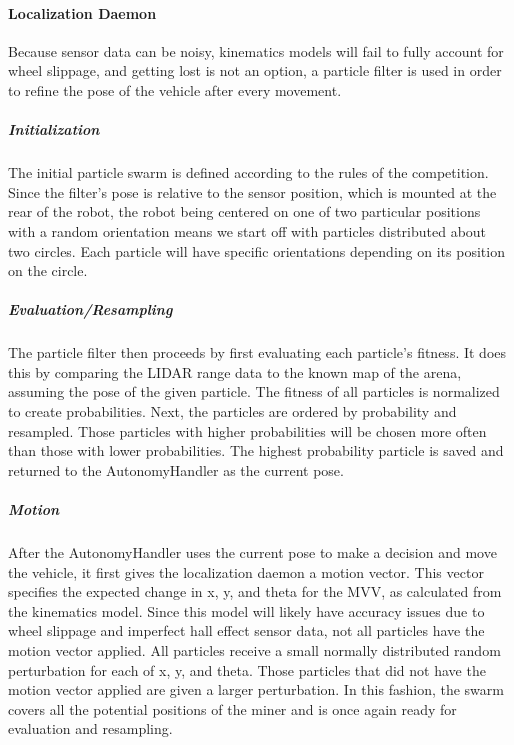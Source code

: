 \paragraph{Localization Daemon}
Because sensor data can be noisy, kinematics models will fail to fully account for wheel slippage, and getting lost is not an option, a particle filter is used in order to refine the pose of the vehicle after every movement.
\subparagraph{Initialization}
The initial particle swarm is defined according to the rules of the competition.  Since the filter's pose is relative to the sensor position, which is mounted at the rear of the robot, the robot being centered on one of two particular positions with a random orientation means we start off with particles distributed about two circles.  Each particle will have specific orientations depending on its position on the circle.
\subparagraph{Evaluation/Resampling}
The particle filter then proceeds by first evaluating each particle's fitness.  It does this by comparing the LIDAR range data to the known map of the arena, assuming the pose of the given particle.  The fitness of all particles is normalized to create probabilities.  Next, the particles are ordered by probability and resampled.  Those particles with higher probabilities will be chosen more often than those with lower probabilities.  The highest probability particle is saved and returned to the AutonomyHandler as the current pose.
\subparagraph{Motion}
After the AutonomyHandler uses the current pose to make a decision and move the vehicle, it first gives the localization daemon a motion vector.  This vector specifies the expected change in x, y, and theta for the MVV, as calculated from the kinematics model.  Since this model will likely have accuracy issues due to wheel slippage and imperfect hall effect sensor data, not all particles have the motion vector applied.  All particles receive a small normally distributed random perturbation for each of x, y, and theta.  Those particles that did not have the motion vector applied are given a larger perturbation.  In this fashion, the swarm covers all the potential positions of the miner and is once again ready for evaluation and resampling.
